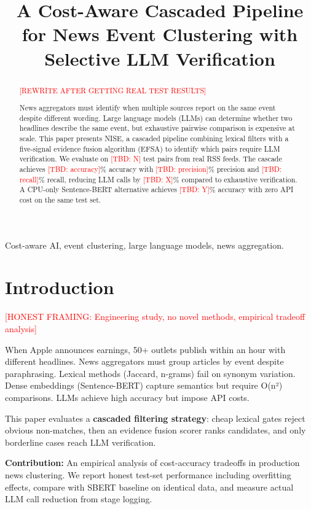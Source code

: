 \documentclass[conference]{IEEEtran}
\title{A Cost-Aware Cascaded Pipeline for News Event Clustering with Selective LLM Verification}
\author{
    \IEEEauthorblockN{Jayadasan S, D. Menaga, Jason Peniel Raj S}
    \IEEEauthorblockA{St. Joseph's Institute of Technology, Chennai, India}
}
\newcommand{\tbd}[1]{\textcolor{red}{[TBD: #1]}}
\begin{document}
\maketitle

\begin{abstract}
\textcolor{red}{[REWRITE AFTER GETTING REAL TEST RESULTS]}

News aggregators must identify when multiple sources report on the same event despite different wording.
Large language models (LLMs) can determine whether two headlines describe the same event, but exhaustive pairwise comparison is expensive at scale.
This paper presents NISE, a cascaded pipeline combining lexical filters with a five-signal evidence fusion algorithm (EFSA) to identify which pairs require LLM verification.
We evaluate on \tbd{N} test pairs from real RSS feeds.
The cascade achieves \tbd{accuracy}\% accuracy with \tbd{precision}\% precision and \tbd{recall}\% recall, reducing LLM calls by \tbd{X}\% compared to exhaustive verification.
A CPU-only Sentence-BERT alternative achieves \tbd{Y}\% accuracy with zero API cost on the same test set.
\end{abstract}

\begin{IEEEkeywords}
Cost-aware AI, event clustering, large language models, news aggregation.
\end{IEEEkeywords}

\section{Introduction}

\textcolor{red}{[HONEST FRAMING: Engineering study, no novel methods, empirical tradeoff analysis]}

When Apple announces earnings, 50+ outlets publish within an hour with different headlines.
News aggregators must group articles by event despite paraphrasing.
Lexical methods (Jaccard, n-grams) fail on synonym variation.
Dense embeddings (Sentence-BERT) capture semantics but require O(n²) comparisons.
LLMs achieve high accuracy but impose API costs.

This paper evaluates a \textbf{cascaded filtering strategy}: cheap lexical gates reject obvious non-matches, then an evidence fusion scorer ranks candidates, and only borderline cases reach LLM verification.

\textbf{Contribution:} An empirical analysis of cost-accuracy tradeoffs in production news clustering.
We report honest test-set performance including overfitting effects, compare with SBERT baseline on identical data, and measure actual LLM call reduction from stage logging.
\end{document}
